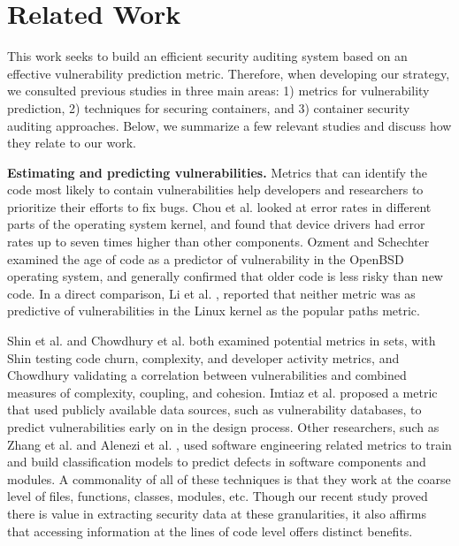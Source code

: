\section{Related Work}
\label{sec.related_work}
This work seeks to build an efficient security auditing system based on an effective vulnerability prediction metric. 
Therefore, when developing our strategy, we consulted previous studies in three main areas: 1) metrics for vulnerability prediction, 2) techniques for securing containers, 
and 3) container security auditing approaches. Below, we summarize a few relevant studies and discuss how they relate to our work. 

\textbf{Estimating and predicting vulnerabilities.} 
Metrics that can identify the code most likely to contain vulnerabilities help developers and researchers to prioritize their efforts to fix bugs. 
Chou et al. \cite{Chou} looked at error rates in different parts of the operating system kernel, and found that device drivers had error rates up to seven times higher than other components. 
Ozment and Schechter \cite{Ozment} examined the age of code as a predictor of vulnerability in the OpenBSD \cite{OpenBSD} operating system, 
and generally confirmed that older code is less risky than new code. In a direct comparison, Li et al. \cite{Lock-in-Pop}, 
reported that neither metric was as predictive of vulnerabilities in the Linux kernel as the popular paths metric. 

Shin et al. \cite{Shin:2011:ECC}  and Chowdhury et al. \cite{SAC10} both examined potential metrics in sets, with Shin testing code churn, complexity, and developer activity metrics, 
and Chowdhury validating a correlation between vulnerabilities and combined measures of complexity, coupling, and cohesion. 
Imtiaz et al. \cite{Imtiaz2018TowardsDV} proposed a metric that used publicly available data sources, such as vulnerability databases, 
to predict vulnerabilities early on in the design process. Other researchers, such as Zhang et al.  \cite{4459644} and Alenezi et al. \cite{Alenezi2015EvaluatingSM}, 
used software engineering related metrics to train and build classification models to predict defects in software components and modules. 
A commonality of all of these techniques is that they work at the coarse level of files, functions, classes, modules, etc. 
Though our recent study proved there is value in extracting security data at these  granularities, it also affirms that accessing information at the lines of code level offers distinct benefits.


